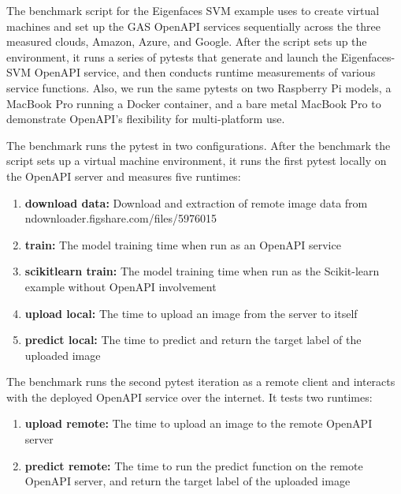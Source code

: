 The benchmark script for the Eigenfaces SVM example uses \Cloudmesh to
create virtual machines and set up the GAS OpenAPI services
sequentially across the three measured clouds, Amazon, Azure, and
Google. After the script sets up the environment, it runs a series of
pytests that generate and launch the Eigenfaces-SVM OpenAPI service,
and then conducts runtime measurements of various service
functions. Also, we run the same pytests on two Raspberry Pi models, a
MacBook Pro running a Docker container, and a bare metal MacBook Pro
to demonstrate \Cloudmesh OpenAPI's flexibility for multi-platform
use.

The benchmark runs the pytest in two configurations. After the benchmark
the script sets up a virtual machine environment, it runs the first pytest
locally on the OpenAPI server and measures five runtimes:

\begin{enumerate}
\def\labelenumi{\arabic{enumi}.}
\item \textbf{download data:} Download and extraction of remote image data from
  ndownloader.figshare.com/files/5976015
\item \textbf{train:} 
  The model training time when run as an OpenAPI service
\item \textbf{scikitlearn train:} 
  The model training time when run as the Scikit-learn example without
  OpenAPI involvement
\item \textbf{upload local:} 
  The time to upload an image from the server to itself
\item \textbf{predict local:} 
  The time to predict and return the target label of the uploaded image
\end{enumerate}

The benchmark runs the second pytest iteration as a remote client and
interacts with the deployed OpenAPI service over the internet. It
tests two runtimes:

\begin{enumerate}
\def\labelenumi{\arabic{enumi}.}
\item \textbf{upload remote:} 
  The time to upload an image to the remote OpenAPI server
\item \textbf{predict remote:} 
  The time to run the predict function on the remote OpenAPI server, and
  return the target label of the uploaded image
\end{enumerate}

